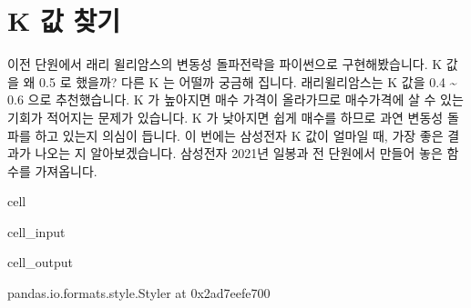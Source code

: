 \documentclass[letterpaper,10pt,english]{jupyterBook}
\begin{document}
\chapter{K 값 찾기}
\label{\detokenize{chapter2/2.4.1_Volatility_Breakout:k}}
\sphinxAtStartPar
이전 단원에서 래리 윌리암스의 변동성 돌파전략을 파이썬으로 구현해봤습니다. K 값을 왜 0.5 로 했을까? 다른 K 는 어떨까 궁금해 집니다. 래리윌리암스는 K 값을 0.4 \textasciitilde{} 0.6 으로 추천했습니다. K 가 높아지면 매수 가격이 올라가므로 매수가격에 살 수 있는 기회가 적어지는 문제가 있습니다. K 가 낮아지면 쉽게 매수를 하므로 과연 변동성 돌파를 하고 있는지 의심이 듭니다. 이 번에는 삼성전자 K 값이 얼마일 때, 가장 좋은 결과가 나오는 지 알아보겠습니다. 삼성전자 2021년 일봉과 전 단원에서 만들어 놓은 함수를 가져옵니다.

\begin{sphinxuseclass}{cell}\begin{sphinxVerbatimInput}

\begin{sphinxuseclass}{cell_input}
\begin{sphinxVerbatim}[commandchars=\\\{\}]
    

   
     
\end{sphinxVerbatim}

\end{sphinxuseclass}\end{sphinxVerbatimInput}
\begin{sphinxVerbatimOutput}

\begin{sphinxuseclass}{cell_output}
\begin{sphinxVerbatim}[commandchars=\\\{\}]
\PYGZlt{}pandas.io.formats.style.Styler at 0x2ad7eefe700\PYGZgt{}
\end{sphinxVerbatim}

\end{sphinxuseclass}\end{sphinxVerbatimOutput}

\end{sphinxuseclass}
\end{document}
